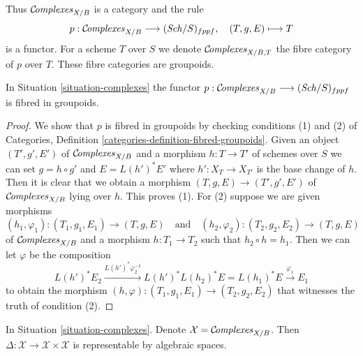 \noindent
Thus $\mathcal{C}\!\mathit{omplexes}_{X/B}$ is a category and the rule
$$
p : \mathcal{C}\!\mathit{omplexes}_{X/B} \longrightarrow (\mathit{Sch}/S)_{fppf},
\quad
(T, g, E) \longmapsto T
$$
is a functor. For a scheme $T$ over $S$ we denote $\mathcal{C}\!\mathit{omplexes}_{X/B, T}$
the fibre category of $p$ over $T$. These fibre categories are groupoids.

\begin{lemma}
\label{lemma-complexes-fibred-in-groupoids}
In Situation \ref{situation-complexes} the functor
$p : \mathcal{C}\!\mathit{omplexes}_{X/B} \longrightarrow (\mathit{Sch}/S)_{fppf}$
is fibred in groupoids.
\end{lemma}

\begin{proof}
We show that $p$ is fibred in groupoids by checking conditions
(1) and (2) of Categories, Definition
\ref{categories-definition-fibred-groupoids}.
Given an object $(T', g', E')$
of $\mathcal{C}\!\mathit{omplexes}_{X/B}$ and a morphism $h : T \to T'$ of
schemes over $S$ we can set $g = h \circ g'$ and
$E = L(h')^*E'$ where $h' : X_T \to X_{T'}$
is the base change of $h$. Then it is clear that we obtain
a morphism $(T, g, E) \to (T', g', E')$
of $\mathcal{C}\!\mathit{omplexes}_{X/B}$ lying over $h$. This proves (1).
For (2) suppose we are given morphisms
$$
(h_1, \varphi_1) : (T_1, g_1, E_1) \to (T, g, E)
\quad\text{and}\quad
(h_2, \varphi_2) : (T_2, g_2, E_2) \to (T, g, E)
$$
of $\mathcal{C}\!\mathit{omplexes}_{X/B}$ and a morphism $h : T_1 \to T_2$ such that
$h_2 \circ h = h_1$. Then we can let $\varphi$ be the composition
$$
L(h')^*E_2
\xrightarrow{L(h')^*\varphi_2^{-1}}
L(h')^*L(h_2)^*E = L(h_1)^*E
\xrightarrow{\varphi_1}
E_1
$$
to obtain the morphism
$(h, \varphi) : (T_1, g_1, E_1) \to (T_2, g_2, E_2)$
that witnesses the truth of condition (2).
\end{proof}

\begin{lemma}
\label{lemma-complexes-diagonal}
In Situation \ref{situation-complexes}. Denote
$\mathcal{X} = \mathcal{C}\!\mathit{omplexes}_{X/B}$. Then
$\Delta : \mathcal{X} \to \mathcal{X} \times \mathcal{X}$ is
representable by algebraic spaces.
\end{lemma}

